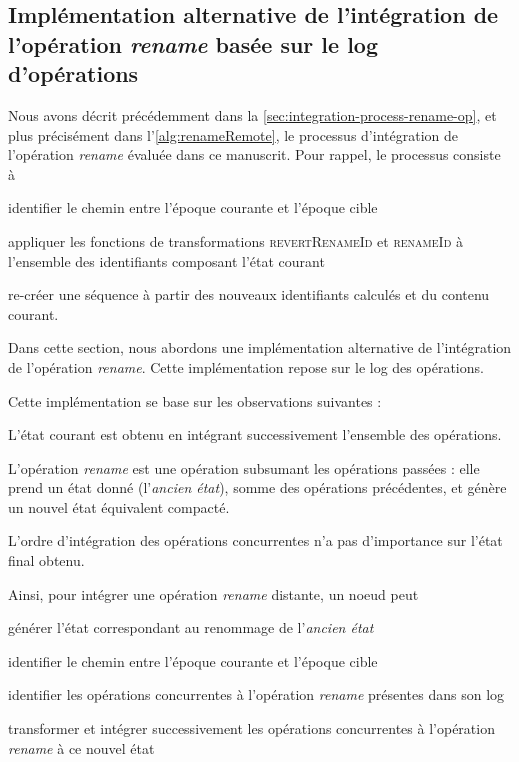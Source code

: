 \documentclass[12pt]{thesul}
\begin{document}
\subsection{Implémentation alternative de l'intégration de l'opération \emph{rename} basée sur le log d'opérations}

Nous avons décrit précédemment dans la \autoref{sec:integration-process-rename-op}, et plus précisément dans l'\autoref{alg:renameRemote}, le processus d'intégration de l'opération \emph{rename} évaluée dans ce manuscrit.
Pour rappel, le processus consiste à
\begin{enumerate*}[label=(\roman*)]
  \item identifier le chemin entre l'époque courante et l'époque cible
  \item appliquer les fonctions de transformations \textsc{revertRenameId} et \textsc{renameId} à l'ensemble des identifiants composant l'état courant
  \item re-créer une séquence à partir des nouveaux identifiants calculés et du contenu courant.
\end{enumerate*}

Dans cette section, nous abordons une implémentation alternative de l'intégration de l'opération \emph{rename}.
Cette implémentation repose sur le log des opérations.

Cette implémentation se base sur les observations suivantes :
\begin{enumerate*}[label=(\roman*)]
  \item L'état courant est obtenu en intégrant successivement l'ensemble des opérations.
  \item L'opération \emph{rename} est une opération subsumant les opérations passées : elle prend un état donné (l'\emph{ancien état}), somme des opérations précédentes, et génère un nouvel état équivalent compacté.
  \item L'ordre d'intégration des opérations concurrentes n'a pas d'importance sur l'état final obtenu.
\end{enumerate*}

Ainsi, pour intégrer une opération \emph{rename} distante, un noeud peut
\begin{enumerate*}[label=(\roman*)]
  \item générer l'état correspondant au renommage de l'\emph{ancien état}
  \item identifier le chemin entre l'époque courante et l'époque cible
  \item identifier les opérations concurrentes à l'opération \emph{rename} présentes dans son log
  \item transformer et intégrer successivement les opérations concurrentes à l'opération \emph{rename} à ce nouvel état
\end{enumerate*}
\end{document}
